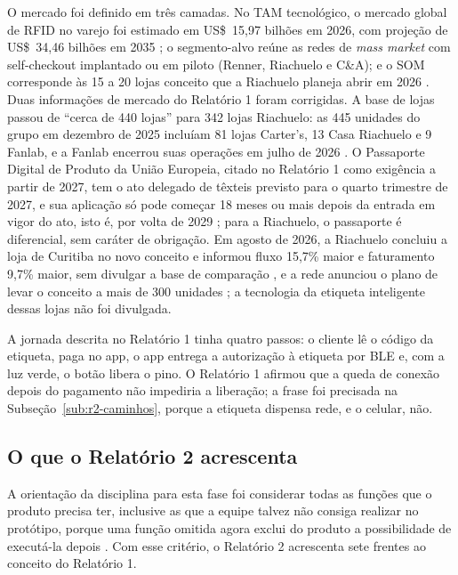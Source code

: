 O mercado foi definido em três camadas. No TAM tecnológico, o mercado global de RFID no varejo foi estimado em US\$~15,97 bilhões em 2026, com projeção de US\$~34,46 bilhões em 2035 \cite{businessresearch2026rfid}; o segmento-alvo reúne as redes de \textit{mass market} com self-checkout implantado ou em piloto (Renner, Riachuelo e C\&A); e o SOM corresponde às 15 a 20 lojas conceito que a Riachuelo planeja abrir em 2026 \cite{mercadoconsumo2026riachuelo}. Duas informações de mercado do Relatório 1 foram corrigidas. A base de lojas passou de ``cerca de 440 lojas'' para 342 lojas Riachuelo: as 445 unidades do grupo em dezembro de 2025 incluíam 81 lojas Carter's, 13 Casa Riachuelo e 9 Fanlab, e a Fanlab encerrou suas operações em julho de 2026 \cite{abvtex2026riachuelo,businessmoment2026riachuelo}. O Passaporte Digital de Produto da União Europeia, citado no Relatório 1 como exigência a partir de 2027, tem o ato delegado de têxteis previsto para o quarto trimestre de 2027, e sua aplicação só pode começar 18 meses ou mais depois da entrada em vigor do ato, isto é, por volta de 2029 \cite{comissaoeuropeia2026dpp,uniaoeuropeia2024espr}; para a Riachuelo, o passaporte é diferencial, sem caráter de obrigação. Em agosto de 2026, a Riachuelo concluiu a loja de Curitiba no novo conceito e informou fluxo 15,7\% maior e faturamento 9,7\% maior, sem divulgar a base de comparação \cite{curitibainforma2026riachuelo}, e a rede anunciou o plano de levar o conceito a mais de 300 unidades \cite{mercadoconsumo2026riachuelo}; a tecnologia da etiqueta inteligente dessas lojas não foi divulgada.

A jornada descrita no Relatório 1 tinha quatro passos: o cliente lê o código da etiqueta, paga no app, o app entrega a autorização à etiqueta por BLE e, com a luz verde, o botão libera o pino. O Relatório 1 afirmou que a queda de conexão depois do pagamento não impediria a liberação; a frase foi precisada na Subseção~\ref{sub:r2-caminhos}, porque a etiqueta dispensa rede, e o celular, não.

\subsection{O que o Relatório 2 acrescenta}
\label{sub:r2-acrescimos}

A orientação da disciplina para esta fase foi considerar todas as funções que o produto precisa ter, inclusive as que a equipe talvez não consiga realizar no protótipo, porque uma função omitida agora exclui do produto a possibilidade de executá-la depois \cite{zancul2026conceitual}. Com esse critério, o Relatório 2 acrescenta sete frentes ao conceito do Relatório 1.

